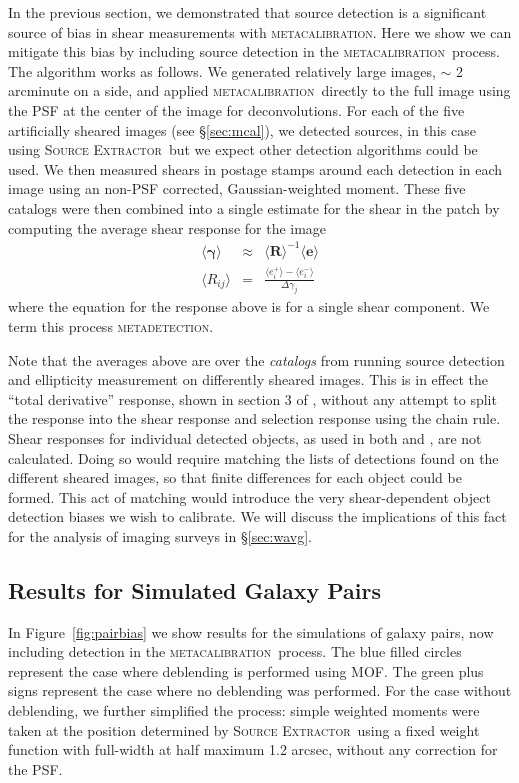 \documentclass[iop, appendixfloats, numberedappendix, apj]{emulateapj}
\newcommand{\mcal}{\textsc{metacalibration}}
\newcommand{\mdet}{\textsc{metadetection}}
\newcommand{\sx}{\textsc{Source Extractor}}
\begin{document}
In the previous section, we demonstrated that source detection is a significant
source of bias in shear measurements with \mcal. Here we show we can
mitigate this bias by including source detection in the
\mcal\ process. The algorithm works as follows.  We generated relatively
large images, $\sim$ 2 arcminute on a side, and applied \mcal\ directly
to the full image using the PSF at the center of the image for deconvolutions.
For each of the five artificially sheared images (see \S \ref{sec:mcal}), we
detected sources, in this case using \sx\ but we expect other detection algorithms
could be used. We then measured shears in postage stamps around
each detection in each image using an non-PSF corrected, Gaussian-weighted
moment.  These five catalogs were then combined into a single estimate for the
shear in the patch by computing the average shear response for the image
\begin{eqnarray}
\langle \boldsymbol\gamma \rangle &\approx& \langle \boldsymbol{R}\rangle^{-1}\langle\boldsymbol{e}\rangle\nonumber\\
\langle R_{ij}\rangle &=& \frac{\langle e_i^{+}\rangle - \langle e_i^{-}\rangle}{\Delta\gamma_j}
\end{eqnarray}
where the equation for the response above is for a single shear component. We term this
process \mdet.

Note that the averages above are over the {\it catalogs} from running source
detection and ellipticity measurement on differently sheared images. This is in
effect the ``total derivative'' response, shown in section 3 of
\cite{SheldonMcal2017}, without any attempt to split the response into the
shear response and selection response using the chain rule.  Shear responses
for individual detected objects, as used in both \cite{SheldonMcal2017} and
\cite{HuffMcal2017}, are not calculated.  Doing so would require matching the
lists of detections found on the different sheared images, so that finite
differences for each object could be formed.  This act of matching would
introduce the very shear-dependent object detection biases we wish to
calibrate.  We will discuss the implications of this fact for the analysis of
imaging surveys in \S \ref{sec:wavg}.

\subsection{Results for Simulated Galaxy Pairs}
\label{sec:mdetpairs}

In Figure~\ref{fig:pairbias} we show results for the simulations of galaxy
pairs, now including detection in the \mcal\ process. The blue filled circles
represent the case where deblending is performed using MOF. The green plus
signs represent the case where no deblending was performed. For the case
without deblending,  we further simplified the process: simple weighted moments
were taken at the position determined by \sx\ using a fixed weight function
with full-width at half maximum 1.2 arcsec, without any correction for the PSF.
\end{document}
